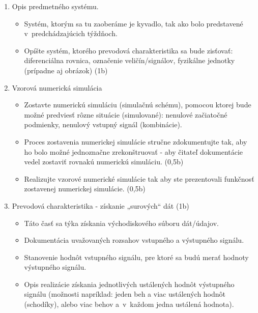 \documentclass[a4paper, 10pt, ]{article}
\begin{document}
\begin{enumerate}[leftmargin=0pt, labelsep=4mm, itemsep=0pt]


	\item Opis predmetného systému.
    \begin{itemize}[leftmargin=0pt, labelsep=4mm, itemsep=0pt] \color{mynotecolor}
        \item Systém, ktorým sa tu zaoberáme je kyvadlo, tak ako bolo predstavené v~predchádzajúcich týždňoch.
        \item Opíšte systém, ktorého prevodová charakteristika sa bude zisťovať: diferenciálna rovnica, označenie veličín/signálov, fyzikálne jednotky (prípadne aj obrázok) \hfill {\color{MidnightBlue} (1b)}
	\end{itemize}



    \item Vzorová numerická simulácia
    \begin{itemize}[leftmargin=0pt, labelsep=4mm, itemsep=0pt] \color{mynotecolor}
        \item Zostavte numerickú simuláciu (simulačnú schému), pomocou ktorej bude možné predviesť rôzne situácie (simulované): nenulové začiatočné podmienky, nenulový vstupný signál (kombinácie).
        \item Proces zostavenia numerickej simulácie stručne zdokumentujte tak, aby ho bolo možné jednoznačne zrekonštruovať - aby čitateľ dokumentácie vedel zostaviť rovnakú numerickú simuláciu. \hfill {\color{MidnightBlue} (0,5b)}
        \item Realizujte vzorové numerické simulácie tak aby ste prezentovali funkčnosť zostavenej numerickej simulácie. \hfill {\color{MidnightBlue} (0,5b)}
	\end{itemize}


    \item Prevodová charakteristika - získanie „surových“ dát \hfill {\color{MidnightBlue} (1b)}
    \begin{itemize}[leftmargin=0pt, labelsep=4mm, itemsep=0pt] \color{mynotecolor}
        \item Táto časť sa týka získania východiskového súboru dát/údajov.
        \item Dokumentácia uvažovaných rozsahov vstupného a výstupného signálu.
        \item Stanovenie hodnôt vstupného signálu, pre ktoré sa budú merať hodnoty výstupného signálu.
        \item Opis realizácie získania jednotlivých ustálených hodnôt výstupného signálu (možnosti napríklad: jeden beh a viac ustálených hodnôt (schodíky), alebo viac behov a~v~každom jedna ustálená hodnota).
	\end{itemize}



\end{enumerate}
\end{document}
